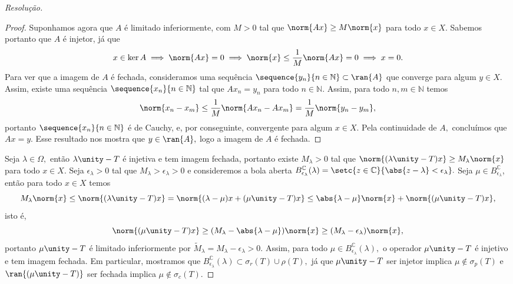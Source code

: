 \begin{proof}[Resolução]
\begin{proof}
    Suponhamos agora que \(A\) é limitado inferiormente, com \(M > 0\) tal que \(\norm{Ax} \geq M\norm{x}\) para todo \(x \in X.\) Sabemos portanto que \(A\) é injetor, já que
    \begin{equation*}
      x \in \ker{A} \implies \norm{Ax} = 0 \implies \norm{x} \leq \frac{1}{M}\norm{Ax} = 0 \implies x = 0.
    \end{equation*}
    Para ver que a imagem de \(A\) é fechada, consideramos uma sequência \(\sequence{y_n}{n\in\mathbb{N}} \subset \ran{A}\) que converge para algum \(y \in X.\) Assim, existe uma sequência \(\sequence{x_n}{n \in \mathbb{N}}\) tal que \(Ax_n = y_n\) para todo \(n \in \mathbb{N}.\) Assim, para todo \(n, m \in \mathbb{N}\) temos
    \begin{equation*}
      \norm{x_n - x_m} \leq \frac{1}{M} \norm{Ax_n - Ax_m} = \frac{1}{M} \norm{y_n - y_m},
    \end{equation*}
    portanto \(\sequence{x_n}{n\in\mathbb{N}}\) é de Cauchy, e, por conseguinte, convergente para algum \(x \in X.\) Pela continuidade de \(A,\) concluímos que \(Ax = y.\) Esse resultado nos mostra que \(y \in \ran{A},\) logo a imagem de \(A\) é fechada.
  \end{proof}

  Seja \(\lambda \in \Omega,\) então \(\lambda \unity - T\) é injetiva e tem imagem fechada, portanto existe \(M_\lambda > 0\) tal que \(\norm{(\lambda \unity - T)x} \geq M_\lambda \norm{x}\) para todo \(x \in X\). Seja \(\epsilon_\lambda > 0\) tal que \(M_\lambda > \epsilon_\lambda > 0\) e consideremos a bola aberta \(B^{\mathbb{C}}_{\epsilon_\lambda}(\lambda) = \setc{z \in \mathbb{C}}{\abs{z - \lambda} < \epsilon_\lambda}.\) Seja \(\mu \in B^{\mathbb{C}}_{\epsilon_\lambda}\), então para todo \(x \in X\) temos
  \begin{equation*}
    M_\lambda\norm{x} \leq \norm{(\lambda \unity - T)x} = \norm{(\lambda - \mu)x + (\mu \unity - T)x} \leq \abs{\lambda - \mu}\norm{x} + \norm{(\mu \unity - T)x},
  \end{equation*}
  isto é,
  \begin{equation*}
    \norm{(\mu \unity - T)x} \geq (M_\lambda - \abs{\lambda - \mu})\norm{x} \geq (M_\lambda - \epsilon_\lambda) \norm{x},
  \end{equation*}
  portanto \(\mu \unity - T\) é limitado inferiormente por \(\tilde{M}_\lambda = M_\lambda - \epsilon_\lambda > 0.\) Assim, para todo \(\mu \in B_{\epsilon_\lambda}^{\mathbb{C}}(\lambda),\) o operador \(\mu \unity - T\) é injetivo e tem imagem fechada. Em particular, mostramos que \(B_{\epsilon_\lambda}^\mathbb{C}(\lambda) \subset \sigma_r(T) \cup \rho(T),\) já que \(\mu \unity - T\) ser injetor implica \(\mu \notin \sigma_p(T)\) e \(\ran{(\mu \unity - T)}\) ser fechada implica \(\mu \notin \sigma_c(T).\)


\end{proof}

